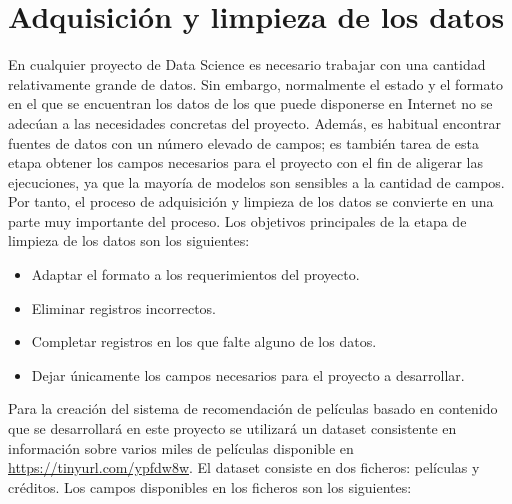 \chapter{Adquisición y limpieza de los datos}\label{chap:adq}

En cualquier proyecto de Data Science es necesario trabajar con una cantidad relativamente grande de datos. Sin embargo, normalmente el estado y el formato en el que se encuentran los datos de los que puede disponerse en Internet no se adecúan a las necesidades concretas del proyecto. Además, es habitual encontrar fuentes de datos con un número elevado de campos; es también tarea de esta etapa obtener los campos necesarios para el proyecto con el fin de aligerar las ejecuciones, ya que la mayoría de modelos son sensibles a la cantidad de campos. Por tanto, el proceso de adquisición y limpieza de los datos se convierte en una parte muy importante del proceso. Los objetivos principales de la etapa de limpieza de los datos son los siguientes:
\begin{itemize}
    \item Adaptar el formato a los requerimientos del proyecto.
    \item Eliminar registros incorrectos.
    \item Completar registros en los que falte alguno de los datos.
    \item Dejar únicamente los campos necesarios para el proyecto a desarrollar.
\end{itemize}

Para la creación del sistema de recomendación de películas basado en contenido que se desarrollará en este proyecto se utilizará un dataset consistente en información sobre varios miles de películas disponible en \url{https://tinyurl.com/ypfdw8w}. El dataset consiste en dos ficheros: películas y créditos. Los campos disponibles en los ficheros son los siguientes:

